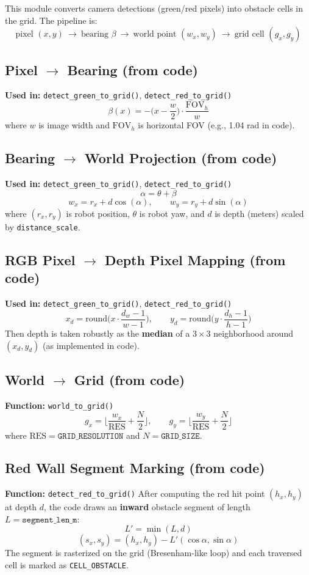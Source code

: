 \documentclass[12pt,a4paper]{article}
\begin{document}
This module converts camera detections (green/red pixels) into obstacle cells in the grid. The pipeline is:
\[
\text{pixel }(x,y)\ \rightarrow\ \text{bearing }\beta\ \rightarrow\ \text{world point }(w_x,w_y)\ \rightarrow\ \text{grid cell }(g_x,g_y)
\]

\subsection{Pixel $\rightarrow$ Bearing (from code)}
\textbf{Used in:} \texttt{detect\_green\_to\_grid()}, \texttt{detect\_red\_to\_grid()}
\[
\beta(x)= -\Big(x-\frac{w}{2}\Big)\cdot \frac{\mathrm{FOV}_h}{w}
\]
where $w$ is image width and $\mathrm{FOV}_h$ is horizontal FOV (e.g., 1.04 rad in code).

\subsection{Bearing $\rightarrow$ World Projection (from code)}
\textbf{Used in:} \texttt{detect\_green\_to\_grid()}, \texttt{detect\_red\_to\_grid()}
\[
\alpha = \theta + \beta
\]
\[
w_x = r_x + d\cos(\alpha),\qquad w_y = r_y + d\sin(\alpha)
\]
where $(r_x,r_y)$ is robot position, $\theta$ is robot yaw, and $d$ is depth (meters) scaled by \texttt{distance\_scale}.

\subsection{RGB Pixel $\rightarrow$ Depth Pixel Mapping (from code)}
\textbf{Used in:} \texttt{detect\_green\_to\_grid()}, \texttt{detect\_red\_to\_grid()}
\[
x_d=\mathrm{round}\Big(x\cdot \frac{d_w-1}{w-1}\Big),\qquad
y_d=\mathrm{round}\Big(y\cdot \frac{d_h-1}{h-1}\Big)
\]
Then depth is taken robustly as the \textbf{median} of a $3\times3$ neighborhood around $(x_d,y_d)$ (as implemented in code).

\subsection{World $\rightarrow$ Grid (from code)}
\textbf{Function:} \texttt{world\_to\_grid()}
\[
g_x=\Big\lfloor \frac{w_x}{\mathrm{RES}}+\frac{N}{2}\Big\rfloor,\qquad
g_y=\Big\lfloor \frac{w_y}{\mathrm{RES}}+\frac{N}{2}\Big\rfloor
\]
where $\mathrm{RES}=\texttt{GRID\_RESOLUTION}$ and $N=\texttt{GRID\_SIZE}$.

\subsection{Red Wall Segment Marking (from code)}
\textbf{Function:} \texttt{detect\_red\_to\_grid()}
After computing the red hit point $(h_x,h_y)$ at depth $d$, the code draws an \textbf{inward} obstacle segment of length $L=\texttt{segment\_len\_m}$:
\[
L'=\min(L,d)
\]
\[
(s_x,s_y)=(h_x,h_y)-L'(\cos\alpha,\sin\alpha)
\]
The segment is rasterized on the grid (Bresenham-like loop) and each traversed cell is marked as \texttt{CELL\_OBSTACLE}.
\end{document}
